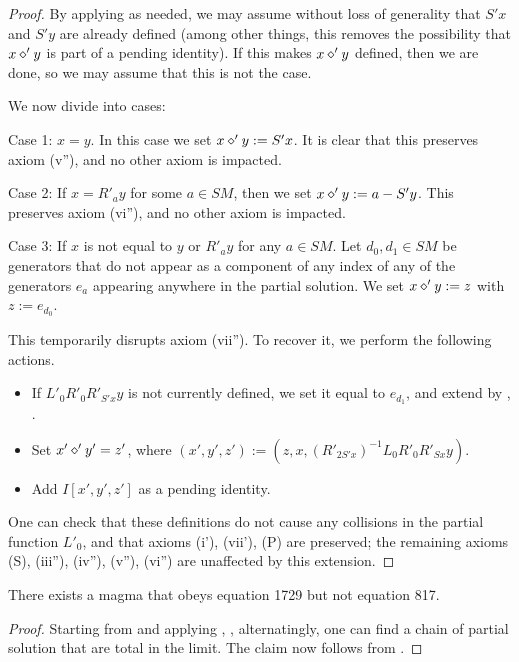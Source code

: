 \begin{proof}  By applying  as needed, we may assume without loss of generality that $S'x$ and $S'y$ are already defined (among other things, this removes the possibility that $x \diamond' y$ is part of a pending identity).  If this makes $x \diamond' y$ defined, then we are done, so we may assume that this is not the case.

We now divide into cases:

Case 1: $x=y$.  In this case we set $x \diamond' y := S'x$.  It is clear that this preserves axiom (v''), and no other axiom is impacted.

Case 2: If $x = R'_a y$ for some $a \in SM$, then we set $x \diamond' y := a - S'y$.  This preserves axiom (vi''), and no other axiom is impacted.

Case 3: If $x$ is not equal to $y$ or $R'_a y$ for any $a \in SM$.  Let $d_0, d_1 \in SM$ be generators that do not appear as a component of any index of any of the generators $e_a$ appearing anywhere in the partial solution.  We set $x \diamond' y := z$ with $z := e_{d_0}$.

This temporarily disrupts axiom (vii'').  To recover it, we perform the following actions.
\begin{itemize}
  \item If $L'_0 R'_0 R'_{S'x} y$ is not currently defined, we set it equal to $e_{d_1}$, and extend by , .
  \item Set $x' \diamond' y' = z'$, where $(x',y',z') := (z, x, (R'_{2S'x})^{-1} L_0 R'_0 R'_{Sx} y)$.
  \item Add $I[x',y',z']$ as a pending identity.
\end{itemize}

One can check that these definitions do not cause any collisions in the partial function $L'_0$, and that axioms (i'), (vii'), (P) are preserved; the remaining axioms (S), (iii''), (iv''), (v''), (vi'') are unaffected by this extension.
\end{proof}


\begin{theorem}\label{1729_refute_817}\leanok There exists a magma that obeys equation 1729 but not equation 817.
\end{theorem}

\begin{proof}
  Starting from  and applying , ,  alternatingly, one can find a chain of partial solution that are total in the limit.  The claim now follows from .
\end{proof}
